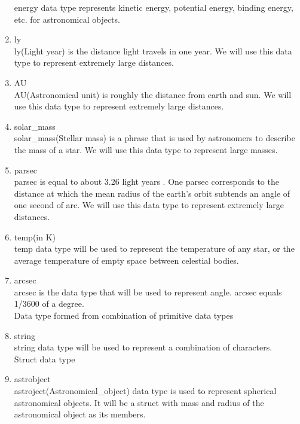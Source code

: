 \documentclass[11pt]{article}
\begin{document}
\begin{enumerate}
energy data type represents kinetic energy, potential energy, binding energy, etc. for astronomical objects.
\item ly\\
ly(Light year) is the distance light travels in one year. We will use this data type to represent extremely large distances.
\item AU\\
AU(Astronomical unit) is roughly the distance from earth and sun. We will use this data type to represent extremely large distances.
\item solar\_mass\\
solar\_mass(Stellar mass) is a phrase that is used by astronomers to describe the mass of a star. We will use this data type to represent large masses.\\
\item parsec\\
parsec is equal to about 3.26 light years . One parsec corresponds to the distance at which the mean radius of the earth's orbit subtends an angle of one second of arc. We will use this data type to represent extremely large distances.\\
\item temp(in K)\\
temp data type will be used to represent the temperature of any star, or the average temperature of empty space between celestial bodies.\\
\item arcsec\\
arcsec is the data type that will be used to represent angle. arcsec equals 1/3600 of a degree.\\
Data type formed from combination of primitive data types
\item string\\
string data type will be used to represent a combination of characters.
\\

Struct data type
\item astrobject\\
astroject(Astronomical\_object) data type is used to represent spherical astronomical objects. It will be a struct with mass and radius of the astronomical object as its members.


\end{enumerate}
\end{document}
